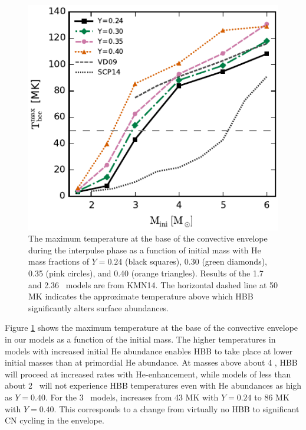 \begin{figure}
 \begin{center}\includegraphics[width=\columnwidth]{fig-maxtbce.pdf}\end{center}
 \caption{The maximum temperature at the base of the convective envelope during the interpulse phase as a function of initial mass with He mass fractions of $Y= 0.24$ (black squares), 0.30 (green diamonds), 0.35 (pink circles), and 0.40 (orange triangles). Results of the 1.7 and 2.36 \Msun\ models are from KMN14. The horizontal dashed line at 50 MK indicates the approximate temperature above which HBB significantly alters surface abundances.}\label{fig:maxtbce}
\end{figure}

Figure \ref{fig:maxtbce} shows the maximum temperature at the base of the convective envelope in our models as a function of the initial mass. The higher temperatures in models with increased initial He abundance enables HBB to take place at lower initial masses than at primordial He abundance. At masses above about 4 \Msun, HBB will proceed at increased rates with He-enhancement, while models of less than about 2 \Msun\ will not experience HBB temperatures even with He abundances as high as $Y=0.40$. For the 3 \Msun\ models,  increases from 43 MK with $Y=0.24$ to 86 MK with $Y=0.40$. This corresponds to a change from virtually no HBB to significant CN cycling in the envelope.

